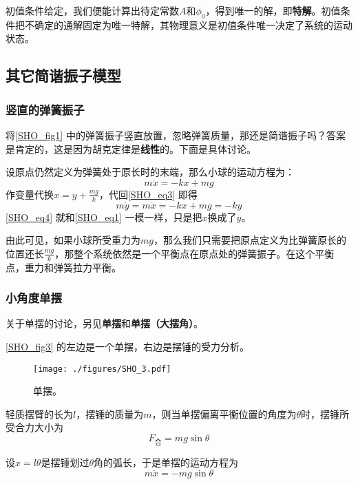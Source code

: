 初值条件给定，我们便能计算出待定常数$A$和$\phi_0$，得到唯一的解，即\textbf{特解}。初值条件把不确定的通解固定为唯一特解，其物理意义是初值条件唯一决定了系统的运动状态。


\subsection{其它简谐振子模型}

\subsubsection{竖直的弹簧振子}

将\autoref{SHO_fig1} 中的弹簧振子竖直放置，忽略弹簧质量，那还是简谐振子吗？答案是肯定的，这是因为胡克定律是\textbf{线性}的。下面是具体讨论。

设原点仍然定义为弹簧处于原长时的末端，那么小球的运动方程为：
\begin{equation}\label{SHO_eq3}
m\ddot{x} = -kx+mg
\end{equation}
作变量代换$x=y+\frac{mg}{k}$，代回\autoref{SHO_eq3} 即得
\begin{equation}\label{SHO_eq4}
m\ddot{y} = m\ddot{x} = -kx+mg = -ky
\end{equation}
\autoref{SHO_eq4} 就和\autoref{SHO_eq1} 一模一样，只是把$x$换成了$y$。

由此可见，如果小球所受重力为$mg$，那么我们只需要把原点定义为比弹簧原长的位置还长$\frac{mg}{k}$，那整个系统依然是一个平衡点在原点处的弹簧振子。在这个平衡点，重力和弹簧拉力平衡。


\subsubsection{小角度单摆}

关于单摆的讨论，另见\textbf{单摆}和\textbf{单摆（大摆角）}。

\autoref{SHO_fig3} 的左边是一个单摆，右边是摆锤的受力分析。

\begin{figure}[ht]
\centering
\texttt{[image: ./figures/SHO\_3.pdf]}
\caption{单摆。} \label{SHO_fig3}
\end{figure}

轻质摆臂的长为$l$，摆锤的质量为$m$，则当单摆偏离平衡位置的角度为$\theta$时，摆锤所受合力大小为
\begin{equation}
F_{\text{合}} = mg\sin\theta
\end{equation}

设$x=l\theta$是摆锤划过$\theta$角的弧长，于是单摆的运动方程为
\begin{equation}\label{SHO_eq5}
m\ddot{x} = -mg\sin\theta
\end{equation}

